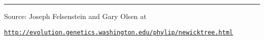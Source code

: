 %
%
%
\begin{center}\rule{0.5\linewidth}{0.5pt}\end{center}


Source:  Joseph Felsenstein and Gary Olsen at

\href{http://evolution.genetics.washington.edu/phylip/newicktree.html}{\texttt{\small http://evolution.genetics.washington.edu/phylip/newicktree.html}}